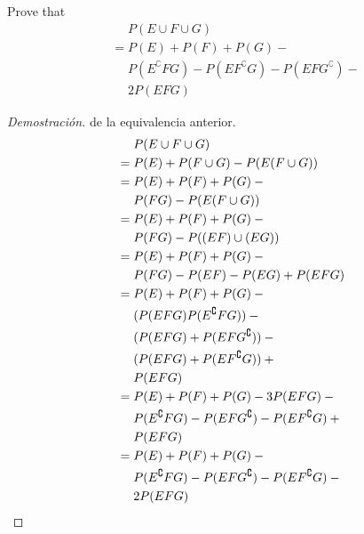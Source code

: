 \item Prove that 
\begin{align*}
    &\phantom{{}={}} P(E \cup F \cup G)\\
    &= P(E) + P(F) + P(G) - {}\\
    &\phantom{{}={}} P(E^\complement FG) - P(EF^\complement G) - P(EFG^\complement ) - {}\\
    &\phantom{{}={}} 2 P(EFG)
\end{align*}

\begin{proof}[Demostración] de la equivalencia anterior.
    \begin{align*}
        &\phantom{{}={}} P(E \cup F \cup G)\\
        &= P(E) + P(F \cup G) - P(E (F \cup G))\\
        &= P(E) + P(F) + P(G) - {}\\
        &\phantom{{}={}} P(FG) - P(E (F \cup G))\\
        &= P(E) + P(F) + P(G) - {}\\
        &\phantom{{}={}} P(FG) - P((E F) \cup (E G))\\
        &= P(E) + P(F) + P(G) - {}\\
        &\phantom{{}={}} P(FG) - P(EF) - P(EG) + P(EFG)\\
        &= P(E) + P(F) + P(G) - {}\\
        &\phantom{{}={}} (P(EFG) P(E^\complement FG)) - {}\\
        &\phantom{{}={}} (P(EFG) + P(EFG^\complement )) - {}\\
        &\phantom{{}={}} (P(EFG) + P(EF^\complement G)) + {}\\
        &\phantom{{}={}} P(EFG)\\
        &= P(E) + P(F) + P(G) - 3 P(EFG) - {}\\
        &\phantom{{}={}} P(E^\complement FG) - P(EFG^\complement ) - P(EF^\complement G) + {}\\
        &\phantom{{}={}} P(EFG)\\
        &= P(E) + P(F) + P(G) - {}\\
        &\phantom{{}={}} P(E^\complement FG) - P(EFG^\complement ) - P(EF^\complement G) - {}\\
        &\phantom{{}={}} 2 P(EFG) \qedhere
    \end{align*}
    
\end{proof}